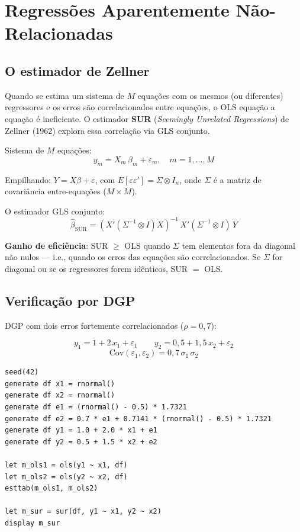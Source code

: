 \chapter{Regressões Aparentemente Não-Relacionadas}
\label{cap:sur}

\section{O estimador de Zellner}

Quando se estima um sistema de $M$ equações com os mesmos (ou diferentes)
regressores e os erros são correlacionados entre equações, o OLS equação
a equação é ineficiente. O estimador \textbf{SUR} (\emph{Seemingly Unrelated
Regressions}) de Zellner (1962) explora essa correlação via GLS conjunto.

Sistema de $M$ equações:
\[
  y_m = X_m\,\beta_m + \varepsilon_m, \quad m = 1,\ldots,M
\]

Empilhando: $Y = X\beta + \varepsilon$, com $E[\varepsilon\varepsilon'] = \Sigma \otimes I_n$,
onde $\Sigma$ é a matriz de covariância entre-equações ($M \times M$).

O estimador GLS conjunto:
\[
  \hat\beta_{\mathrm{SUR}} = (X'(\Sigma^{-1}\otimes I)X)^{-1}\,X'(\Sigma^{-1}\otimes I)\,Y
\]

\textbf{Ganho de eficiência}: SUR $\geq$ OLS quando $\Sigma$ tem elementos
fora da diagonal não nulos — i.e., quando os erros das equações são
correlacionados. Se $\Sigma$ for diagonal ou se os regressores forem idênticos,
SUR $=$ OLS.

\section{Verificação por DGP}

DGP com dois erros fortemente correlacionados ($\rho = 0{,}7$):

\[
  y_1 = 1 + 2\,x_1 + \varepsilon_1 \qquad y_2 = 0{,}5 + 1{,}5\,x_2 + \varepsilon_2
\]
\[
  \mathrm{Cov}(\varepsilon_1, \varepsilon_2) = 0{,}7\,\sigma_1\,\sigma_2
\]

\begin{lstlisting}[caption={DGP SUR e comparação com OLS equação a equação}]
seed(42)
generate df x1 = rnormal()
generate df x2 = rnormal()
generate df e1 = (rnormal() - 0.5) * 1.7321
generate df e2 = 0.7 * e1 + 0.7141 * (rnormal() - 0.5) * 1.7321
generate df y1 = 1.0 + 2.0 * x1 + e1
generate df y2 = 0.5 + 1.5 * x2 + e2

let m_ols1 = ols(y1 ~ x1, df)
let m_ols2 = ols(y2 ~ x2, df)
esttab(m_ols1, m_ols2)

let m_sur = sur(df, y1 ~ x1, y2 ~ x2)
display m_sur
\end{lstlisting}

